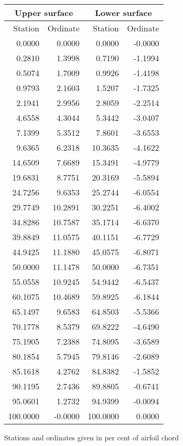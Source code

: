 \documentclass[11pt]{book}
\begin{document}
 \hspace{4mm}
 \begin{tabular}{|r|r|r|r|} \hline 
 \multicolumn{2}{|c|}{Upper surface} & \multicolumn{2}{|c|}{Lower surface} \\
 \hline
 Station & Ordinate & Station & Ordinate \\
 \hline
0.0000 & 0.0000 & 0.0000 & -0.0000 \\
0.2810 & 1.3998 & 0.7190 & -1.1994 \\
0.5074 & 1.7009 & 0.9926 & -1.4198 \\
0.9793 & 2.1603 & 1.5207 & -1.7325 \\
2.1941 & 2.9956 & 2.8059 & -2.2514 \\
4.6558 & 4.3044 & 5.3442 & -3.0407 \\
7.1399 & 5.3512 & 7.8601 & -3.6553 \\
9.6365 & 6.2318 & 10.3635 & -4.1622 \\
14.6509 & 7.6689 & 15.3491 & -4.9779 \\
19.6831 & 8.7751 & 20.3169 & -5.5894 \\
24.7256 & 9.6353 & 25.2744 & -6.0554 \\
29.7749 & 10.2891 & 30.2251 & -6.4002 \\
34.8286 & 10.7587 & 35.1714 & -6.6370 \\
39.8849 & 11.0575 & 40.1151 & -6.7729 \\
44.9425 & 11.1880 & 45.0575 & -6.8071 \\
50.0000 & 11.1478 & 50.0000 & -6.7351 \\
55.0558 & 10.9245 & 54.9442 & -6.5437 \\
60.1075 & 10.4689 & 59.8925 & -6.1844 \\
65.1497 & 9.6583 & 64.8503 & -5.5366 \\
70.1778 & 8.5379 & 69.8222 & -4.6490 \\
75.1905 & 7.2388 & 74.8095 & -3.6589 \\
80.1854 & 5.7945 & 79.8146 & -2.6089 \\
85.1618 & 4.2762 & 84.8382 & -1.5852 \\
90.1195 & 2.7436 & 89.8805 & -0.6741 \\
95.0601 & 1.2732 & 94.9399 & -0.0094 \\
100.0000 & -0.0000 & 100.0000 & 0.0000 \\
 \hline 
 \end{tabular}
 \vspace{8mm}

Stations and ordinates given in per cent of airfoil chord
\end{document}
